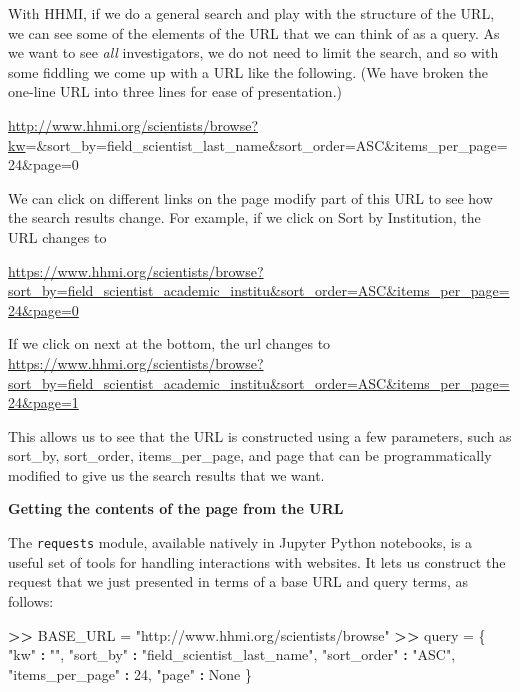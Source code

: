 \documentclass[]{krantz}
\newenvironment{Shaded}{\begin{snugshade}}{\end{snugshade}}
\newcommand{\DecValTok}[1]{\textcolor[rgb]{0.00,0.00,0.81}{#1}}
\newcommand{\StringTok}[1]{\textcolor[rgb]{0.31,0.60,0.02}{#1}}
\newcommand{\OperatorTok}[1]{\textcolor[rgb]{0.81,0.36,0.00}{\textbf{#1}}}
\newcommand{\ErrorTok}[1]{\textcolor[rgb]{0.64,0.00,0.00}{\textbf{#1}}}
\newcommand{\NormalTok}[1]{#1}
\begin{document}
With HHMI, if we do a general search and play with the structure of the
URL, we can see some of the elements of the URL that we can think of as
a query. As we want to see \emph{all} investigators, we do not need to
limit the search, and so with some fiddling we come up with a URL like
the following. (We have broken the one-line URL into three lines for
ease of presentation.)

\enlargethispage{6pt}

\url{http://www.hhmi.org/scientists/browse?kw}=\&sort\_by=field\_scientist\_last\_name\&sort\_order=ASC\&items\_per\_page=24\&page=0

We can click on different links on the page modify part of this URL to
see how the search results change. For example, if we click on Sort by
Institution, the URL changes to

\url{https://www.hhmi.org/scientists/browse?sort_by=field_scientist_academic_institu\&sort_order=ASC\&items_per_page=24\&page=0}

If we click on next at the bottom, the url changes to
\url{https://www.hhmi.org/scientists/browse?sort_by=field_scientist_academic_institu\&sort_order=ASC\&items_per_page=24\&page=1}

This allows us to see that the URL is constructed using a few
parameters, such as sort\_by, sort\_order, items\_per\_page, and page
that can be programmatically modified to give us the search results that
we want.

\textbf{Getting the contents of the page from the URL}

The \texttt{requests} module, available natively in Jupyter Python
notebooks, is a useful set of tools for handling interactions with
websites. It lets us construct the request that we just presented in
terms of a base URL and query terms, as follows:

\begin{Shaded}
\begin{Highlighting}[]
\OperatorTok{>}\ErrorTok{>}\StringTok{ }\NormalTok{BASE_URL =}\StringTok{ "http://www.hhmi.org/scientists/browse"}
\OperatorTok{>}\ErrorTok{>}\StringTok{ }\NormalTok{query =}\StringTok{ }\NormalTok{\{}
            \StringTok{"kw"} \OperatorTok{:}\StringTok{ ""}\NormalTok{,}
            \StringTok{"sort_by"} \OperatorTok{:}\StringTok{ "field_scientist_last_name"}\NormalTok{,}
            \StringTok{"sort_order"} \OperatorTok{:}\StringTok{ "ASC"}\NormalTok{,}
            \StringTok{"items_per_page"} \OperatorTok{:}\StringTok{ }\DecValTok{24}\NormalTok{,}
            \StringTok{"page"} \OperatorTok{:}\StringTok{ }\NormalTok{None}
\NormalTok{           \}}
\end{Highlighting}
\end{Shaded}
\end{document}

